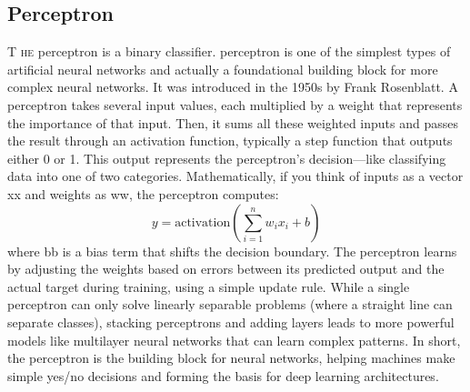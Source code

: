 \documentclass{book}
\begin{document}
\subsection{Perceptron}
\lettrine{T}{ he} perceptron is a binary classifier. perceptron is one of the simplest types of artificial neural networks and actually a foundational building block for more complex neural networks. It was introduced in the 1950s by Frank Rosenblatt.
A perceptron takes several input values, each multiplied by a weight that represents the importance of that input. Then, it sums all these weighted inputs and passes the result through an activation function, typically a step function that outputs either 0 or 1. This output represents the perceptron’s decision—like classifying data into one of two categories.
Mathematically, if you think of inputs as a vector xx and weights as ww, the perceptron computes:
$$ y = \text{activation}\left(\sum_{i=1}^n w_i x_i + b \right) $$
where bb is a bias term that shifts the decision boundary.
The perceptron learns by adjusting the weights based on errors between its predicted output and the actual target during training, using a simple update rule. While a single perceptron can only solve linearly separable problems (where a straight line can separate classes), stacking perceptrons and adding layers leads to more powerful models like multilayer neural networks that can learn complex patterns.
In short, the perceptron is the building block for neural networks, helping machines make simple yes/no decisions and forming the basis for deep learning architectures.
\end{document}
